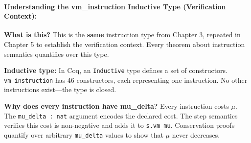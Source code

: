 \paragraph{Understanding the vm\_instruction Inductive Type (Verification Context):}

\textbf{What is this?} This is the \textbf{same} instruction type from Chapter 3, repeated in Chapter 5 to establish the verification context. Every theorem about instruction semantics quantifies over this type.

\textbf{Inductive type:} In Coq, an \texttt{Inductive} type defines a set of constructors. \texttt{vm\_instruction} has 46 constructors, each representing one instruction. No other instructions exist---the type is closed.

\textbf{Why does every instruction have mu\_delta?} Every instruction costs $\mu$. The \texttt{mu\_delta : nat} argument encodes the declared cost. The step semantics verifies this cost is non-negative and adds it to \texttt{s.vm\_mu}. Conservation proofs quantify over arbitrary \texttt{mu\_delta} values to show that $\mu$ never decreases.

